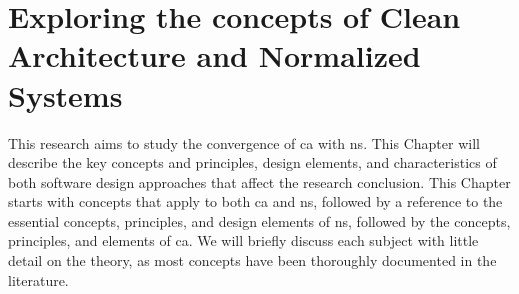 \chapter{Exploring the concepts of Clean Architecture and Normalized Systems} \label{chap_theoreticalbackground} 

This research aims to study the convergence of \gls{ca} with \gls{ns}. This Chapter will
describe the key concepts and principles, design elements, and characteristics of both
software design approaches that affect the research conclusion. This Chapter starts with
concepts that apply to both \gls{ca} and \gls{ns}, followed by a reference to the
essential concepts, principles, and design elements of \gls{ns}, followed by the concepts,
principles, and elements of \gls{ca}. We will briefly discuss each subject with little
detail on the theory, as most concepts have been thoroughly documented in the literature.





